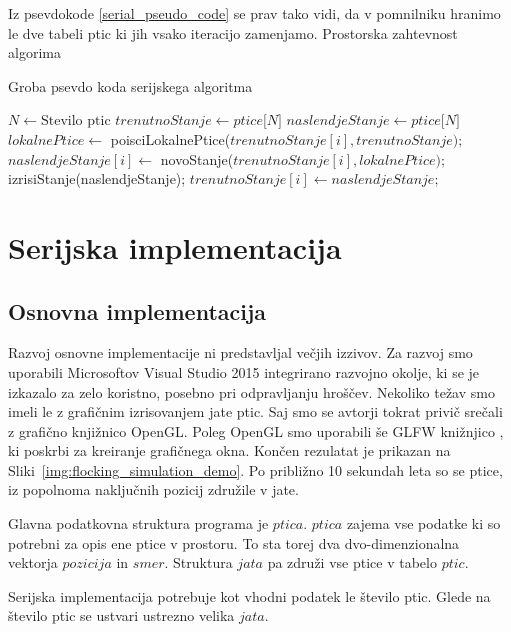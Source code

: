 \documentclass[a4paper, 12pt]{book}
\begin{document}
Iz psevdokode \ref{serial_pseudo_code} se prav tako vidi, da v pomnilniku hranimo le dve tabeli ptic ki jih vsako iteracijo zamenjamo. Prostorska zahtevnost algorima
\begin{algorithm}
\caption{Groba psevdo koda serijskega algoritma}\label{serial_pseudo_code}
\begin{algorithmic}[1]
\State $N \gets \text{Stevilo ptic}$
\State $trenutnoStanje \gets \textit{ptice[N]}$
\State $naslendjeStanje \gets \textit{ptice[N]}$
\Loop
{}
\State $lokalnePtice \gets$ poisciLokalnePtice($trenutnoStanje[i], trenutnoStanje);$
\State $naslendjeStanje[i] \gets$ novoStanje($trenutnoStanje[i], lokalnePtice);$
\EndFor
\State izrisiStanje(naslendjeStanje);
\State $trenutnoStanje[i] \gets naslendjeStanje;$
\EndLoop
\end{algorithmic}
\end{algorithm}

\chapter{Serijska implementacija}
\label{ch1}
\section{Osnovna implementacija}
Razvoj osnovne implementacije ni predstavljal večjih izzivov. Za razvoj smo uporabili Microsoftov Visual Studio 2015 integrirano razvojno okolje, ki se je izkazalo za zelo koristno, posebno pri odpravljanju hroščev. Nekoliko težav smo imeli le z grafičnim izrisovanjem jate ptic. Saj smo se avtorji tokrat privič srečali z grafično knjižnico OpenGL. Poleg OpenGL smo uporabili še GLFW knižnjico , ki poskrbi za kreiranje grafičnega okna. Končen rezulatat je prikazan na Sliki~\ref{img:flocking_simulation_demo}. Po približno 10 sekundah leta so se ptice, iz popolnoma naključnih pozicij združile v jate.

Glavna podatkovna struktura programa je $ptica$. $ptica$ zajema vse podatke ki so potrebni za opis ene ptice v prostoru. To sta torej dva dvo-dimenzionalna vektorja $pozicija$ in $smer$. Struktura $jata$ pa združi vse ptice v tabelo $ptic$.

Serijska implementacija potrebuje kot vhodni podatek le število ptic. Glede na število ptic se ustvari ustrezno velika $jata$.

\end{document}
